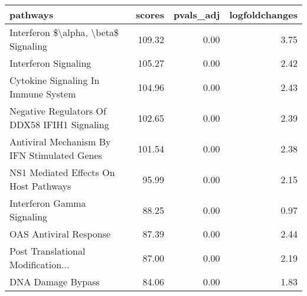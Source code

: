 \begin{tabular}{lrrr}
\toprule
pathways & scores & pvals\_adj & logfoldchanges \\
\midrule
Interferon \$\textbackslash alpha, \textbackslash beta\$ Signaling & 109.32 & 0.00 & 3.75 \\
Interferon Signaling & 105.27 & 0.00 & 2.42 \\
Cytokine Signaling In Immune System & 104.96 & 0.00 & 2.43 \\
Negative Regulators Of DDX58 IFIH1  Signaling & 102.65 & 0.00 & 2.39 \\
Antiviral Mechanism By IFN Stimulated Genes & 101.54 & 0.00 & 2.38 \\
NS1 Mediated Effects On Host Pathways & 95.99 & 0.00 & 2.15 \\
Interferon Gamma Signaling & 88.25 & 0.00 & 0.97 \\
OAS Antiviral Response & 87.39 & 0.00 & 2.44 \\
Post Translational Modification... & 87.00 & 0.00 & 2.19 \\
DNA Damage Bypass & 84.06 & 0.00 & 1.83 \\
\bottomrule
\end{tabular}
